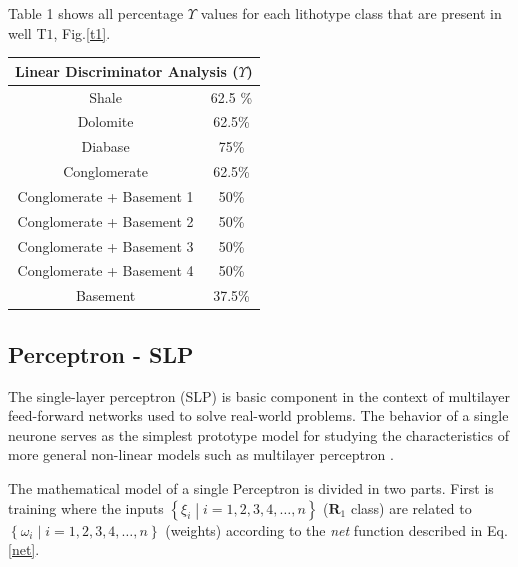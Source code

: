 \documentclass{cilamce19}
\begin{document}
Table 1 shows all percentage $\Upsilon$ values for each lithotype class that are present in well T$1$, Fig.\ref{t1}.

{
	\begin{center}
		
		\begin{tabular}{|c|c|}
			\hline
			\multicolumn{2}{|c|}{Linear Discriminator Analysis ($\Upsilon$)} \\
			\hline
			Shale &  62.5 \%\\
			\hline
			Dolomite & 62.5\% \\
			\hline
			Diabase   & 75\%  \\
			\hline
			Conglomerate   & 62.5\%  \\
			\hline
			Conglomerate + Basement  1 & 50\%  \\
			\hline
			Conglomerate + Basement  2 & 50\%  \\
			\hline
			Conglomerate + Basement  3 & 50\%  \\
			\hline
			Conglomerate + Basement  4 & 50\%  \\
			\hline
			Basement   & 37.5\%  \\
			\hline
			
		\end{tabular}
	\end{center}
	\label{tab}
} 

\subsection{Perceptron - SLP}

The single-layer perceptron (SLP) is basic component in the context of multilayer feed-forward networks used to solve real-world problems. The behavior of a single neurone serves as the simplest prototype model for studying the characteristics of more general non-linear models such as multilayer perceptron \citep{Raudys1998}.

The mathematical model of a single Perceptron is divided in two parts. First is training where the inputs $\left\lbrace \xi_{i}  \middle| i = 1, 2, 3, 4, \dots, n \right\rbrace$ ($\textbf{R}_{1}$ class) are related to $\left\lbrace \omega_{i}  \middle| i = 1, 2, 3, 4, \dots, n \right\rbrace$ (weights) according to the \textit{net} function described in Eq. \ref{net}. 
\end{document}
